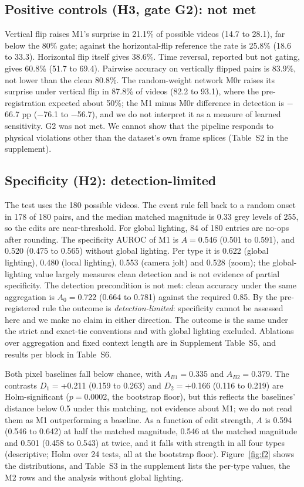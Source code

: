 \subsection{Positive controls (H3, gate G2): not met}
\label{sec:res-h3}
Vertical flip raises M1's surprise in 21.1\% of possible videos (14.7 to 28.1), far below the 80\% gate; against the horizontal-flip reference the rate is 25.8\% (18.6 to 33.3). Horizontal flip itself gives 38.6\%. Time reversal, reported but not gating, gives 60.8\% (51.7 to 69.4). Pairwise accuracy on vertically flipped pairs is 83.9\%, not lower than the clean 80.8\%. The random-weight network M0r raises its surprise under vertical flip in 87.8\% of videos (82.2 to 93.1), where the pre-registration expected about 50\%; the M1 minus M0r difference in detection is $-$66.7 pp ($-$76.1 to $-$56.7), and we do not interpret it as a measure of learned sensitivity. G2 was not met. We cannot show that the pipeline responds to physical violations other than the dataset's own frame splices (Table~S2 in the supplement).

\subsection{Specificity (H2): detection-limited}
\label{sec:res-h2}
The test uses the 180 possible videos. The event rule fell back to a random onset in 178 of 180 pairs, and the median matched magnitude is 0.33 grey levels of 255, so the edits are near-threshold. For global lighting, 84 of 180 entries are no-ops after rounding. The specificity AUROC of M1 is $A=$0.546 (0.501 to 0.591), and 0.520 (0.475 to 0.565) without global lighting. Per type it is 0.622 (global lighting), 0.480 (local lighting), 0.553 (camera jolt) and 0.528 (zoom); the global-lighting value largely measures clean detection and is not evidence of partial specificity. The detection precondition is not met: clean accuracy under the same aggregation is $A_0=$0.722 (0.664 to 0.781) against the required 0.85. By the pre-registered rule the outcome is \emph{detection-limited}: specificity cannot be assessed here and we make no claim in either direction. The outcome is the same under the strict and exact-tie conventions and with global lighting excluded. Ablations over aggregation and fixed context length are in Supplement Table~S5, and results per block in Table~S6.

Both pixel baselines fall below chance, with $A_{B1}=$0.335 and $A_{B2}=$0.379. The contrasts $D_1=$+0.211 (0.159 to 0.263) and $D_2=$+0.166 (0.116 to 0.219) are Holm-significant ($p=$0.0002, the bootstrap floor), but this reflects the baselines' distance below 0.5 under this matching, not evidence about M1; we do not read them as M1 outperforming a baseline. As a function of edit strength, $A$ is 0.594 (0.546 to 0.642) at half the matched magnitude, 0.546 at the matched magnitude and 0.501 (0.458 to 0.543) at twice, and it falls with strength in all four types (descriptive; Holm over 24 tests, all at the bootstrap floor). Figure~\ref{fig:f2} shows the distributions, and Table~S3 in the supplement lists the per-type values, the M2 rows and the analysis without global lighting.

